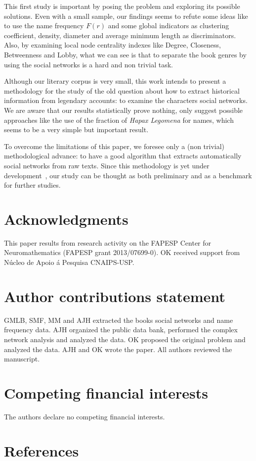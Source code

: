 \documentclass[review]{elsarticle}
\begin{document}
This first study is important by posing the problem and
exploring its possible solutions.
Even with a small sample, our findings seems 
to refute some ideas like to use the
name frequency $F(r)$ and some global indicators as 
clustering coefficient, density, 
diameter and average minimum length as discriminators. 
Also, by examining local node centrality indexes like 
Degree, Closeness, Betweenness and Lobby,
what we can see is that to separate the book genres by
using the social networks is a hard and  non trivial task.

Although our literary corpus is very small, this work
intends to present a methodology for the study of the
old question about how to extract historical information from
legendary accounts: to examine the characters social networks. 
We are aware that our results statistically 
prove nothing, only suggest  possible approaches like the
use of the fraction of \emph{Hapax Legomena} for names, which seems to
be a very simple but important result. 

To overcome the limitations of this paper, 
we foresee only a (non trivial)
methodological advance: to have a good algorithm that 
extracts automatically social networks from raw texts. 
Since this methodology is yet under
development~\cite{elson2010extracting,grayson2016sense}, 
our study can be thought as both 
preliminary and as a benchmark for further studies.

\section*{Acknowledgments}
This paper results from research activity on the 
FAPESP Center for Neuromathematics (FAPESP grant 2013/07699-0). 
OK received support from N\'ucleo de Apoio \'a Pesquisa 
CNAIPS-USP. 

\section*{Author contributions statement}

GMLB, SMF, MM and AJH extracted the books social networks and 
name frequency data. AJH organized the public data bank, 
performed the complex network analysis and analyzed the data.
OK proposed the original problem and analyzed the data. AJH and
OK wrote the paper. All authors reviewed the manuscript.

\section*{Competing financial interests} The authors 
declare no competing financial interests.

\section*{References}

 

\end{document}

